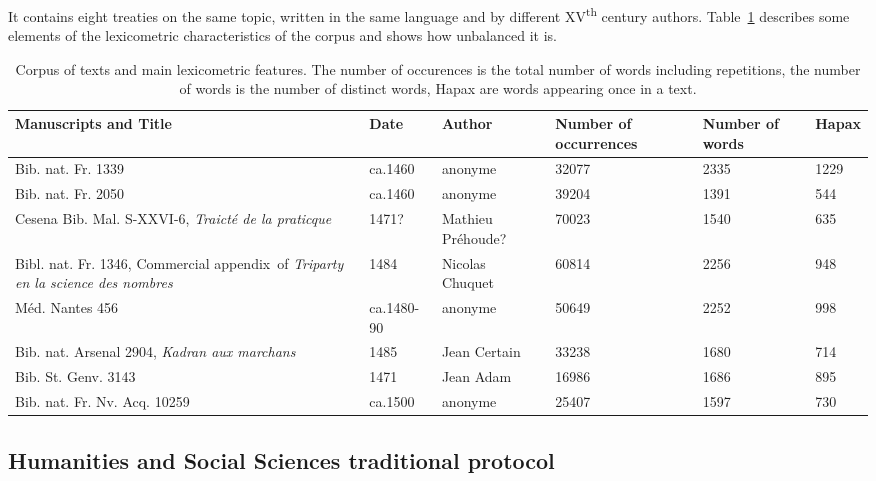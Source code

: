\documentclass[preprint]{elsarticle}
\begin{document}
It contains eight treaties on the same topic, written in the same language and by different XV\textsuperscript{th} century authors. Table~\ref{tab:chronomss} describes some elements of the lexicometric characteristics of the corpus and shows how unbalanced it is.

\begin{table}
\begin{center}
\begin{small}
\setlength{\tabcolsep}{4pt}
\renewcommand{\arraystretch}{1.2}
\begin{tabular}{|p{4cm}|p{1.5cm}|p{1.5cm}|p{1.8cm}|p{1.4cm}|p{1.3cm}|}
\hline
\textbf{Manuscripts} and \textbf{Title} &   \textbf{Date} & \textbf{Author}  & \textbf{Number of} \textbf{occurrences} & \textbf{Number of} \textbf{words} & \textbf{Hapax} \\\hline\hline
Bib. nat. Fr. 1339 & ca.1460 & anonyme & 32077 & 2335 & 1229 \\
Bib. nat. Fr. 2050 & ca.1460 & anonyme & 39204 & 1391 & 544 \\
Cesena Bib. Mal. S-XXVI-6, \textit{Traict\'e de la praticque}  & 1471? & Mathieu {Pr\'ehoude}? & 70023 & 1540 & 635 \\
Bibl. nat. Fr. 1346, Commercial appendix~of \textit{Triparty en la science des nombres} & 1484		& Nicolas Chuquet & 60814 & 2256 & 948 \\ 
M\'ed. Nantes 456   & ca.1480-90		& anonyme & 50649 & 2252 & 998\\
Bib. nat. Arsenal 2904, \textit{Kadran aux marchans} & 1485 & Jean Certain & 33238 &1680 &714 \\ 
Bib. St. Genv. 3143 & 1471 & Jean Adam & 16986 & 1686 & 895\\
Bib. nat. Fr. Nv. Acq. 10259 & ca.1500 & anonyme & 25407 & 1597  &730 \\
\hline
\end{tabular}
\end{small}
\end{center}
\caption{Corpus of texts and main lexicometric features. The number of occurences is the total number of words including repetitions, the number of words is the number of distinct words, Hapax are words appearing once in a text.}
\label{tab:chronomss}
\end{table}
\subsection{Humanities and Social Sciences traditional protocol}
\end{document}
